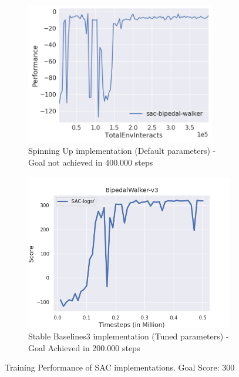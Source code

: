\begin{figure}[h]
     \centering
     \begin{subfigure}[t]{0.49\textwidth}
         \centering
         \includegraphics[width=0.91\textwidth]{figures/rl-framework/sac-bipedal-walker.png}
         \caption{Spinning Up implementation (Default parameters) - Goal not achieved in 400.000 steps}
     \end{subfigure}
     \hfill
     \begin{subfigure}[t]{0.49\textwidth}
         \centering
         \includegraphics[width=\textwidth]{figures/rl-framework/sb3-sac-BipedalWalker-v3.png}
         \caption{Stable Baselines3 implementation (Tuned parameters) - Goal Achieved in 200.000 steps}
     \end{subfigure}
        \caption{Training Performance of SAC implementations. Goal Score: 300}
        \label{fig:spinup-vs-sb3}
\end{figure}

